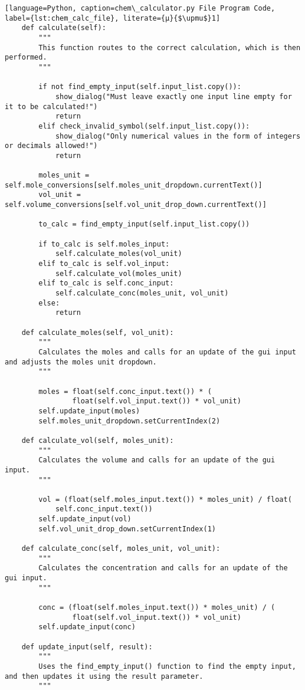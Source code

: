 \begin{lstlisting}[language=Python, caption=chem\_calculator.py File Program Code, label={lst:chem_calc_file}, literate={μ}{$\upmu$}1]
    def calculate(self):
        """
        This function routes to the correct calculation, which is then performed.
        """

        if not find_empty_input(self.input_list.copy()):
            show_dialog("Must leave exactly one input line empty for it to be calculated!")
            return
        elif check_invalid_symbol(self.input_list.copy()):
            show_dialog("Only numerical values in the form of integers or decimals allowed!")
            return

        moles_unit = self.mole_conversions[self.moles_unit_dropdown.currentText()]
        vol_unit = self.volume_conversions[self.vol_unit_drop_down.currentText()]

        to_calc = find_empty_input(self.input_list.copy())

        if to_calc is self.moles_input:
            self.calculate_moles(vol_unit)
        elif to_calc is self.vol_input:
            self.calculate_vol(moles_unit)
        elif to_calc is self.conc_input:
            self.calculate_conc(moles_unit, vol_unit)
        else:
            return

    def calculate_moles(self, vol_unit):
        """
        Calculates the moles and calls for an update of the gui input and adjusts the moles unit dropdown.
        """

        moles = float(self.conc_input.text()) * (
                float(self.vol_input.text()) * vol_unit)
        self.update_input(moles)
        self.moles_unit_dropdown.setCurrentIndex(2)

    def calculate_vol(self, moles_unit):
        """
        Calculates the volume and calls for an update of the gui input.
        """

        vol = (float(self.moles_input.text()) * moles_unit) / float(
            self.conc_input.text())
        self.update_input(vol)
        self.vol_unit_drop_down.setCurrentIndex(1)

    def calculate_conc(self, moles_unit, vol_unit):
        """
        Calculates the concentration and calls for an update of the gui input.
        """

        conc = (float(self.moles_input.text()) * moles_unit) / (
                float(self.vol_input.text()) * vol_unit)
        self.update_input(conc)

    def update_input(self, result):
        """
        Uses the find_empty_input() function to find the empty input, and then updates it using the result parameter.
        """


\end{lstlisting}
